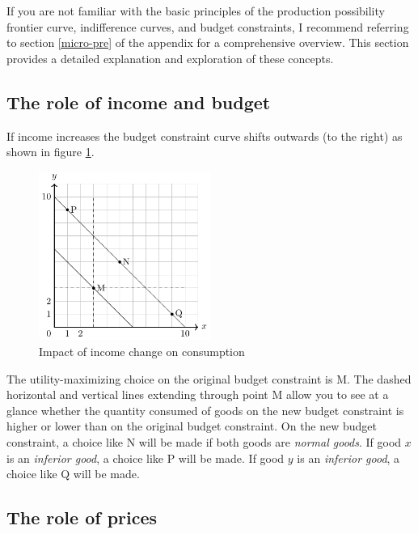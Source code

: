 \documentclass[
  12pt,
  oneside]{book}
\theoremstyle{definition}
\theoremstyle{definition}
\theoremstyle{definition}
\theoremstyle{definition}
\theoremstyle{remark}
\begin{document}
If you are not familiar with the basic principles of the production possibility frontier curve, indifference curves, and budget constraints, I recommend referring to section \ref{micro-pre} of the appendix for a comprehensive overview. This section provides a detailed explanation and exploration of these concepts.

\hypertarget{the-role-of-income-and-budget}{%
\subsection{The role of income and budget}\label{the-role-of-income-and-budget}}

If income increases the budget constraint curve shifts outwards (to the right) as shown in figure \ref{fig:incomechange}.

\begin{figure}
\centering
\includegraphics[width=0.5\textwidth,height=\textheight]{fig/incomechange.png}
\caption{\label{fig:incomechange} Impact of income change on consumption}
\end{figure}

The utility-maximizing choice on the original budget constraint is M. The dashed horizontal and vertical lines extending through point M allow you to see at a glance whether the quantity consumed of goods on the new budget constraint is higher or lower than on the original budget constraint. On the new budget constraint, a choice like N will be made if both goods are \emph{normal goods}. If good \(x\) is an \emph{inferior good}, a choice like P will be made. If good \(y\) is an \emph{inferior good}, a choice like Q will be made.

\hypertarget{the-role-of-prices}{%
\subsection{The role of prices}\label{the-role-of-prices}}
\end{document}
